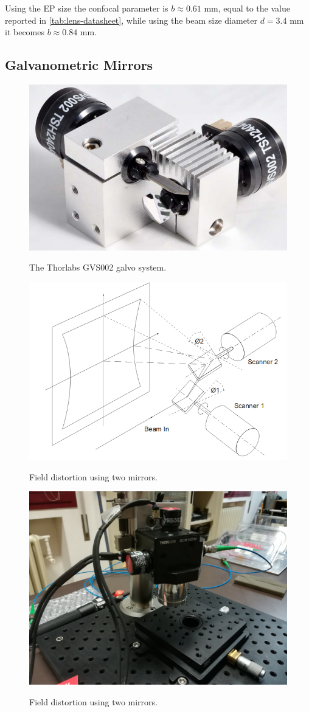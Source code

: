  
 Using the EP size the confocal parameter is $b \approx 0.61$ mm, equal to the value reported in \autoref{tab:lens-datasheet}, while using the beam size diameter $d = 3.4$ mm it becomes $b \approx 0.84$ mm. 
 
 

\subsection{Galvanometric Mirrors}

\begin{figure}[bth]
	\myfloatalign
	{\includegraphics[width=0.6\linewidth]{gfx/ch3/galvo}}
	\caption{The Thorlabs GVS002 galvo system.}\label{fig:galvo}
\end{figure}

\begin{figure}[bth]
	\myfloatalign
	{\includegraphics[width=0.75\linewidth]{gfx/ch3/galvo-distortion}}
	\caption{Field distortion using two mirrors.}\label{fig:galvo-distortion}
\end{figure}


\begin{figure}[bth]
	\myfloatalign
	{\includegraphics[width=0.75\linewidth]{gfx/ch3/testa}}
	\caption{Field distortion using two mirrors.}\label{fig:testa}
\end{figure}
	

